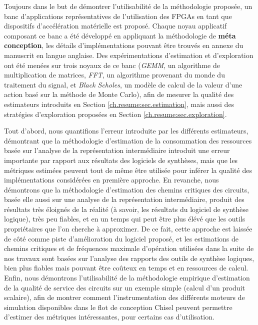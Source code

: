     Toujours dans le but de démontrer l'utilisabilité de la méthodologie proposée, un banc d'applications représentatives de l'utilisation des FPGAs en tant que dispositifs d'accélération matérielle est proposé.
    Chaque noyau applicatif composant ce banc a été développé en appliquant la méthodologie de {\bf méta conception}, les détails d'implémentations pouvant être trouvés en annexe du manuscrit en langue anglaise.
    Des expérimentations d'estimation et d'exploration ont été menées sur trois noyaux de ce banc ({\it GEMM}, un algorithme de multiplication de matrices, {\it FFT}, un algorithme provenant du monde du traitement du signal, et {\it Black Scholes}, un modèle de calcul de la valeur d'une action basé sur la méthode de Monte Carlo), afin de mesurer la qualité des estimateurs introduits en Section \ref{ch.resume:sec.estimation}, mais aussi des stratégies d'exploration proposées en Section \ref{ch.resume:sec.exploration}.

    Tout d'abord, nous quantifions l'erreur introduite par les différents estimateurs, démontrant que la méthodologie d'estimation de la consommation des ressources basée sur l'analyse de la représentation intermédiaire introduit une erreur importante par rapport aux résultats des logiciels de synthèses, mais que les métriques estimées peuvent tout de même être utilisée pour inférer la qualité des implémentations considérées en première approche.
    En revanche, nous démontrons que la méthodologie d'estimation des chemins critiques des circuits, basée elle aussi sur une analyse de la représentation intermédiaire, produit des résultats très éloignés de la réalité (à savoir, les résultats du logiciel de synthèse logique), très peu fiables, et en un temps qui peut être plus élévé que les outils propriétaires que l'on cherche à approximer.
    De ce fait, cette approche est laissée de côté comme piste d'amélioration du logiciel proposé, et les estimations de chemins critiques et de fréquences maximale d'opération utilisées dans la suite de nos travaux sont basées sur l'analyse des rapports des outils de synthèse logiques, bien plus fiables mais pouvant être coûteux en temps et en ressources de calcul.
    Enfin, nous démontrons l'utilisabilité de la méthodologie empirique d'estimation de la qualité de service des circuits sur un exemple simple (calcul d'un produit scalaire), afin de montrer comment l'instrumentation des différents moteurs de simulation disponibles dans le flot de conception Chisel peuvent permettre d'estimer des métriques intéressantes, pour certains cas d'utilisation.

